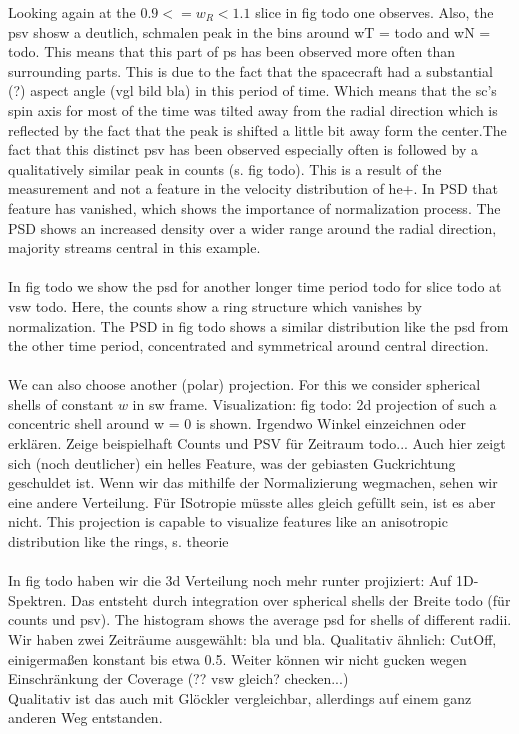 Looking again at the $0.9 <= w_R < 1.1$ slice in fig todo one observes.
Also, the psv shosw a deutlich, schmalen peak in the bins around wT = todo and wN = todo. This means that this part of ps has been observed more often than surrounding parts. This is due to the fact that the spacecraft had a substantial (?) aspect angle (vgl bild bla) in this period of time. Which means that the sc's spin axis for most of the time was tilted away from the radial direction which is reflected by the fact that the peak is shifted a little bit away form the center.The fact that this distinct psv has been observed especially often is followed by a qualitatively similar peak in counts (s. fig todo). 
This is a result of the measurement and not a feature in the velocity distribution of he+. In PSD that feature has vanished, which shows the importance of normalization process. The PSD shows an increased density over a wider range around the radial direction, majority streams central in this example. \\ \\
In fig todo we show the psd for another longer time period todo for slice todo at vsw todo. Here, the counts show a ring structure which vanishes by normalization. 
The PSD in fig todo shows a similar distribution like the psd from the other time period, concentrated and symmetrical around central direction.
\\ \\
We can also choose another (polar) projection. For this we consider spherical shells of constant $w$ in sw frame. Visualization: fig todo: 2d projection of such a concentric shell around w = 0 is shown. Irgendwo Winkel einzeichnen oder erklären.
Zeige beispielhaft Counts und PSV für Zeitraum todo... Auch hier zeigt sich (noch deutlicher) ein helles Feature, was der gebiasten Guckrichtung geschuldet ist. Wenn wir das mithilfe der Normalizierung wegmachen, sehen wir eine andere Verteilung. Für ISotropie müsste alles gleich gefüllt sein, ist es aber nicht.
This projection is capable to visualize features like an anisotropic distribution like the rings, s. theorie
\\ \\
In fig todo haben wir die 3d Verteilung noch mehr runter projiziert: Auf 1D-Spektren. Das entsteht durch integration over spherical shells der Breite todo (für counts und psv). The histogram shows the average psd for shells of different radii.
Wir haben zwei Zeiträume ausgewählt: bla und bla.
Qualitativ ähnlich: CutOff, einigermaßen konstant bis etwa 0.5. Weiter können wir nicht gucken wegen Einschränkung der Coverage (?? vsw gleich? checken...)
\\
Qualitativ ist das auch mit Glöckler vergleichbar, allerdings auf einem ganz anderen Weg entstanden.






